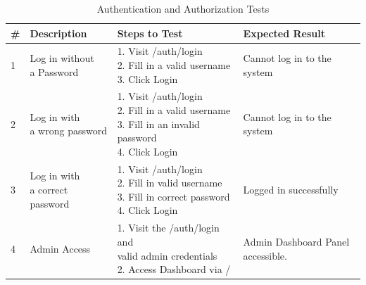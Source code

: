 \documentclass[12pt,a4paper]{report}
\begin{document}
\begin{table}[h]
\begin{tabular}{|l|l|l|l|}
\hline
 \textbf{\#} & \textbf{Description}  & \textbf{Steps to Test}  & \textbf{Expected Result}   \\ \hline
1 
& 
\makecell{
Log in without\\ a Password
}
& 
\makecell{
1. Visit /auth/login\\
2. Fill in a valid username\\
3. Click Login 
}
& 
Cannot log in to the system \\ \hline



2
& 
\makecell{
Log in with \\a wrong password
}
& 
\makecell{
1. Visit /auth/login\\
2. Fill in a valid username\\
3. Fill in an invalid password\\
4. Click Login 
}
& 
Cannot log in to the system \\ \hline



3 
&
\makecell{
 Log in with \\a correct password
 }
& 
\makecell{
1. Visit /auth/login\\
2. Fill in valid username\\
3. Fill in correct password \\
4. Click Login 
}
& 
Logged in successfully \\ \hline


4 
&
Admin Access
& 
\makecell {
1. Visit the /auth/login and \\ valid admin credentials \\
2. Access Dashboard via /
}
&
\makecell {Admin Dashboard Panel \\ accessible.} \\ \hline

% 

\end{tabular}
\centering
\caption{Authentication and Authorization Tests}
\end{table}
\end{document}
